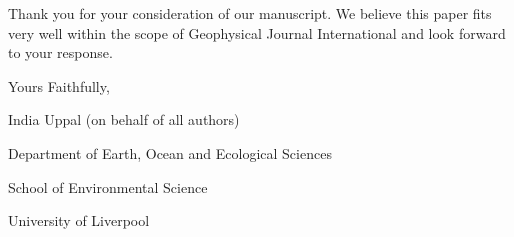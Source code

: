 \documentclass[a4paper,onecolumn,10pt]{article}
\begin{document}
Thank you for your consideration of our manuscript. We believe this paper fits very well within the scope of Geophysical Journal International and look forward to your response.

\begin{flushleft}
  Yours Faithfully,
  
  India Uppal (on behalf of all authors)
  \\[0.25cm]
  {
    \color{mediumgray}
    \small
    Department of Earth, Ocean and Ecological Sciences
    
    School of Environmental Science
    
    University of Liverpool

  }
\end{flushleft}
\end{document}
